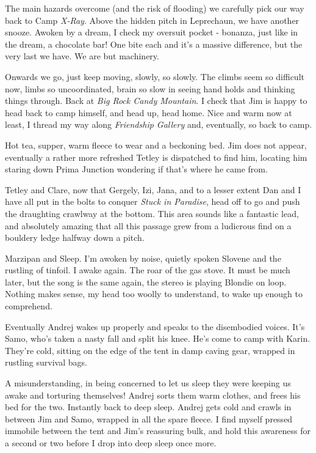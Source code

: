 The main hazards overcome (and the risk of flooding) we carefully pick
our way back to Camp \emph{X-Ray}. Above the hidden pitch in Leprechaun,
we have another snooze. Awoken by a dream, I check my oversuit pocket -
bonanza, just like in the dream, a chocolate bar! One bite each and it's
a massive difference, but the very last we have. We are but machinery.

Onwards we go, just keep moving, slowly, so slowly. The climbs seem so
difficult now, limbs so uncoordinated, brain so slow in seeing hand
holds and thinking things through. Back at \emph{Big Rock Candy
Mountain}. I check that Jim is happy to head back to camp himself, and
head up, head home. Nice and warm now at least, I thread my way along
\emph{Friendship Gallery} and, eventually, so back to camp.

Hot tea, supper, warm fleece to wear and a beckoning bed. Jim does not
appear, eventually a rather more refreshed Tetley is dispatched to find
him, locating him staring down Prima Junction wondering if that's where
he came from.

Tetley and Clare, now that Gergely, Izi, Jana, and to a lesser extent
Dan and I have all put in the bolts to conquer \emph{Stuck in Paradise},
head off to go and push the draughting crawlway at the bottom. This area
sounds like a fantastic lead, and absolutely amazing that all this
passage grew from a ludicrous find on a bouldery ledge halfway down a
pitch.

Marzipan and Sleep. I'm awoken by noise, quietly spoken Slovene and the
rustling of tinfoil. I awake again. The roar of the gas stove. It must
be much later, but the song is the same again, the stereo is playing
Blondie on loop. Nothing makes sense, my head too woolly to understand,
to wake up enough to comprehend.

Eventually Andrej wakes up properly and speaks to the disembodied
voices. It's Samo, who's taken a nasty fall and split his knee. He's
come to camp with Karin. They're cold, sitting on the edge of the tent
in damp caving gear, wrapped in rustling survival bags.

A misunderstanding, in being concerned to let us sleep they were keeping
us awake and torturing themselves! Andrej sorts them warm clothes, and
frees his bed for the two. Instantly back to deep sleep. Andrej gets
cold and crawls in between Jim and Samo, wrapped in all the spare
fleece. I find myself pressed immobile between the tent and Jim's
reassuring bulk, and hold this awareness for a second or two before I
drop into deep sleep once more.

